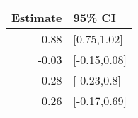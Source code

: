 \begin{tabular}{rl}
  \hline
Estimate & 95\% CI \\ 
  \hline
0.88 & [0.75,1.02] \\ 
  -0.03 & [-0.15,0.08] \\ 
  0.28 & [-0.23,0.8] \\ 
  0.26 & [-0.17,0.69] \\ 
   \hline
\end{tabular}


